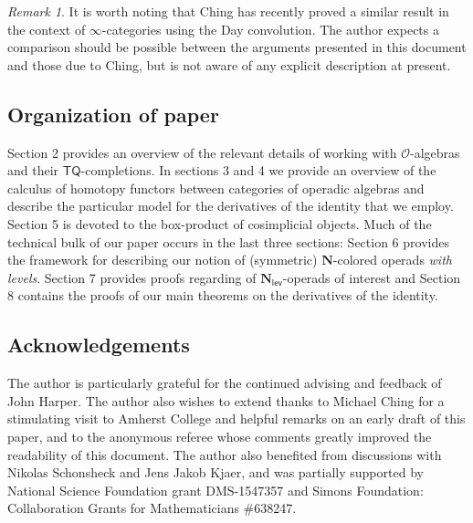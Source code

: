\documentclass[11pt]{amsart}
\theoremstyle{definition}
\theoremstyle{remark}
\newtheorem{remark}[subsection]{Remark}
\newcommand{\TQ}{\mathsf{TQ}}
\newcommand{\Cal}[1]{\mathcal{#1}}
\newcommand{\Nl}{\mathbf{N}_{\mathsf{lev}}}
\begin{document}
\begin{remark} It is worth noting that Ching \cite{Ching-day-conv} has recently proved a similar result in the context of $\infty$-categories using the Day convolution. The author expects a comparison should be possible between the arguments presented in this document and those due to Ching, but is not aware of any explicit description at present. 
\end{remark}

\subsection{Organization of paper} 
Section 2 provides an overview of the relevant details of working with $\Cal{O}$-algebras and their $\TQ$-completions. In sections 3 and 4 we provide an overview of the calculus of homotopy functors between categories of operadic algebras and describe the particular model for the derivatives of the identity that we employ. Section 5 is devoted to the box-product of cosimplicial objects. Much of the technical bulk of our paper occurs in the last three sections: Section 6 provides the framework for describing our notion of (symmetric) $\mathbf{N}$-colored operads \textit{with levels}. Section 7 provides proofs regarding of $\Nl$-operads of interest and Section 8 contains the proofs of our main theorems on the derivatives of the identity.

\subsection{Acknowledgements} The author is particularly grateful for the continued advising and feedback of John Harper. The author also wishes to extend thanks to Michael Ching for a stimulating visit to Amherst College and helpful remarks on an early draft of this paper, and to the anonymous referee whose comments greatly improved the readability of this document. The author also benefited from discussions with Nikolas Schonsheck and Jens Jakob Kjaer, and was partially supported by National Science Foundation grant DMS-1547357 and Simons Foundation: Collaboration Grants for Mathematicians \#638247.


\end{document}
